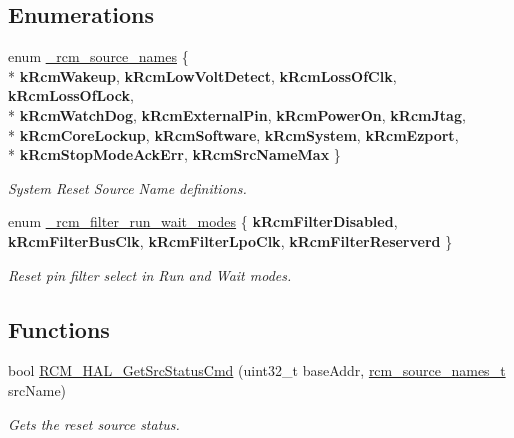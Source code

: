 \subsection*{Enumerations}
\begin{DoxyCompactItemize}
\item 
enum \hyperlink{group__rcm__hal_gafb712d57b425f25cb495aad2e4fb1fbc}{\+\_\+rcm\+\_\+source\+\_\+names} \{ \\*
{\bfseries k\+Rcm\+Wakeup}, 
{\bfseries k\+Rcm\+Low\+Volt\+Detect}, 
{\bfseries k\+Rcm\+Loss\+Of\+Clk}, 
{\bfseries k\+Rcm\+Loss\+Of\+Lock}, 
\\*
{\bfseries k\+Rcm\+Watch\+Dog}, 
{\bfseries k\+Rcm\+External\+Pin}, 
{\bfseries k\+Rcm\+Power\+On}, 
{\bfseries k\+Rcm\+Jtag}, 
\\*
{\bfseries k\+Rcm\+Core\+Lockup}, 
{\bfseries k\+Rcm\+Software}, 
{\bfseries k\+Rcm\+System}, 
{\bfseries k\+Rcm\+Ezport}, 
\\*
{\bfseries k\+Rcm\+Stop\+Mode\+Ack\+Err}, 
{\bfseries k\+Rcm\+Src\+Name\+Max}
 \}\hypertarget{group__rcm__hal_gafb712d57b425f25cb495aad2e4fb1fbc}{}\label{group__rcm__hal_gafb712d57b425f25cb495aad2e4fb1fbc}
\begin{DoxyCompactList}\small\item\em System Reset Source Name definitions. \end{DoxyCompactList}
\item 
enum \hyperlink{group__rcm__hal_ga5295e3eef3122de8735e6b4aaa64d746}{\+\_\+rcm\+\_\+filter\+\_\+run\+\_\+wait\+\_\+modes} \{ {\bfseries k\+Rcm\+Filter\+Disabled}, 
{\bfseries k\+Rcm\+Filter\+Bus\+Clk}, 
{\bfseries k\+Rcm\+Filter\+Lpo\+Clk}, 
{\bfseries k\+Rcm\+Filter\+Reserverd}
 \}\hypertarget{group__rcm__hal_ga5295e3eef3122de8735e6b4aaa64d746}{}\label{group__rcm__hal_ga5295e3eef3122de8735e6b4aaa64d746}
\begin{DoxyCompactList}\small\item\em Reset pin filter select in Run and Wait modes. \end{DoxyCompactList}
\end{DoxyCompactItemize}
\subsection*{Functions}
\begin{DoxyCompactItemize}
\item 
bool \hyperlink{group__rcm__hal_ga3232cf9a28d96ebf9bb8095fbad18389}{R\+C\+M\+\_\+\+H\+A\+L\+\_\+\+Get\+Src\+Status\+Cmd} (uint32\+\_\+t base\+Addr, \hyperlink{group__rcm__hal_gaf0d8e1d6126e3bea2f23fe1f32e02433}{rcm\+\_\+source\+\_\+names\+\_\+t} src\+Name)
\begin{DoxyCompactList}\small\item\em Gets the reset source status. \end{DoxyCompactList}\end{DoxyCompactItemize}


